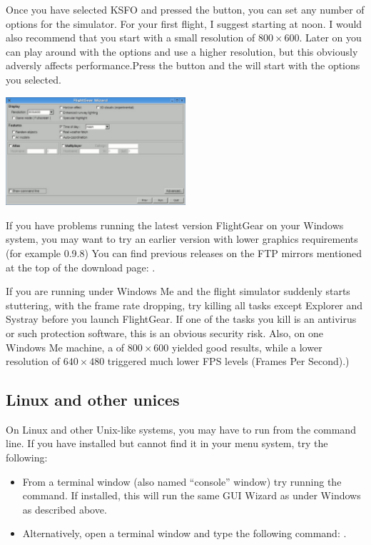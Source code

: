 Once you have selected KSFO and pressed the  button, you can set
any number of options for the simulator. For your first flight, I suggest
starting at noon. I would also recommend that you start with a small resolution
of $800\times600$. Later on you can play around with the options and use a
higher resolution, but this obviously adversly affects performance.Press the 
 button and the \FlightGear{} will start with the options you 
selected.

\begin{center}
\includegraphics[width=0.5\textwidth]{img/tut_4}
\end{center}

If you have problems running the latest version FlightGear on
your Windows system, you may want to try an earlier version with lower
graphics requirements (for example 0.9.8) You can find previous releases on 
the FTP mirrors mentioned at the top of the \FlightGear{} download page:
.
   
If you are running under Windows Me and the flight simulator suddenly starts
stuttering, with the frame rate dropping, 
try killing all tasks except Explorer and Systray before you
launch FlightGear. If one of the tasks you kill is an antivirus or
such protection software, this is an obvious security risk. Also, on one
Windows Me machine, a \FlightGear{} of $800\times600$ yielded good results,
while a lower resolution of $640\times480$ triggered much lower FPS levels 
(Frames Per Second).)

\subsection{Linux and other unices}

On Linux and other Unix-like systems, you may have to run \FlightGear{} from 
the command line. If you have installed \FlightGear{} but cannot find it 
in your menu system, try the 
following:

\begin{itemize}
  \item From a terminal window (also named ``console'' window) try
  running the   command. If installed, this will run the same 
  GUI Wizard as under Windows as described above.

	\item Alternatively, open a terminal window and type the following command:
  . 
\end{itemize}

